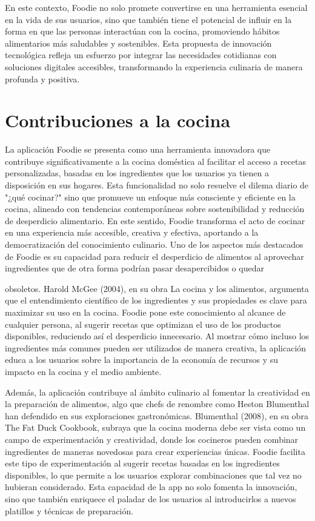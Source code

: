 \documentclass[a4paper,12pt]{article}
\begin{document}
En este contexto, Foodie no solo promete convertirse en una herramienta esencial en la vida de sus usuarios, sino que también tiene el potencial de influir en la forma en que las personas interactúan con la cocina, promoviendo hábitos alimentarios más saludables y sostenibles. Esta propuesta de innovación tecnológica refleja un esfuerzo por integrar las necesidades cotidianas con soluciones digitales accesibles, transformando la experiencia culinaria de manera profunda y positiva.

\section*{Contribuciones a la cocina}
La aplicación Foodie se presenta como una herramienta innovadora que contribuye significativamente a la cocina doméstica al facilitar el acceso a recetas personalizadas, basadas en los ingredientes que los usuarios ya tienen a disposición en sus hogares. Esta funcionalidad no solo resuelve el dilema diario de "¿qué cocinar?" sino que promueve un enfoque más consciente y eficiente en la cocina, alineado con tendencias contemporáneas sobre sostenibilidad y reducción de desperdicio alimentario. En este sentido, Foodie transforma el acto de cocinar en una experiencia más accesible, creativa y efectiva, aportando a la democratización del conocimiento culinario.
Uno de los aspectos más destacados de Foodie es su capacidad para reducir el desperdicio de alimentos al aprovechar ingredientes que de otra forma podrían pasar desapercibidos o quedar
 
obsoletos. Harold McGee (2004),  en su obra La cocina y los alimentos, argumenta que el entendimiento científico de los ingredientes y sus propiedades es clave para maximizar su uso en la cocina. Foodie pone este conocimiento al alcance de cualquier persona, al sugerir recetas que optimizan el uso de los productos disponibles, reduciendo así el desperdicio innecesario. Al mostrar cómo incluso los ingredientes más comunes pueden ser utilizados de manera creativa, la aplicación educa a los usuarios sobre la importancia de la economía de recursos y su impacto en la cocina y el medio ambiente.

Además, la aplicación contribuye al ámbito culinario al fomentar la creatividad en la preparación de alimentos, algo que chefs de renombre como Heston Blumenthal han defendido en sus exploraciones gastronómicas. Blumenthal (2008), en su obra The Fat Duck Cookbook, subraya que la cocina moderna debe ser vista como un campo de experimentación y creatividad, donde los cocineros pueden combinar ingredientes de maneras novedosas para crear experiencias únicas. Foodie facilita este tipo de experimentación al sugerir recetas basadas en los ingredientes disponibles, lo que permite a los usuarios explorar combinaciones que tal vez no hubieran considerado. Esta capacidad de la app no solo fomenta la innovación, sino que también enriquece el paladar de los usuarios al introducirlos a nuevos platillos y técnicas de preparación.
\end{document}
